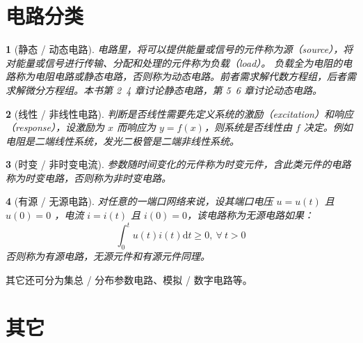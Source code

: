 \documentclass[UTF8]{report}
\theoremstyle{MyLineTheoremStyle} %
\theoremstyle{MyBlockTheoremStyle} %
\theoremstyle{MySubsubsectionStyle} %
\newtheorem{definition}{}
\begin{document}
\section{电路分类}


\begin{definition}[静态 / 动态电路]
    电路里，将可以提供能量或信号的元件称为源（source），将对能量或信号进行传输、分配和处理的元件称为负载（load）。
    负载全为电阻的电路称为电阻电路或静态电路，否则称为动态电路。前者需求解代数方程组，后者需求解微分方程组。本书第 2~4 章讨论静态电路，第 5~6 章讨论动态电路。
\end{definition}


\begin{definition}[线性 / 非线性电路]
判断是否线性需要先定义系统的激励（excitation）和响应（response），设激励为 $x$ 而响应为 $y = f(x)$，则系统是否线性由 $f$ 决定。例如电阻是二端线性系统，发光二极管是二端非线性系统。
\end{definition}


\begin{definition}[时变 / 非时变电流]
参数随时间变化的元件称为时变元件，含此类元件的电路称为时变电路，否则称为非时变电路。
\end{definition}


\begin{definition}[有源 / 无源电路]
对任意的一端口网络来说，设其端口电压 $u = u(t)$ 且 $u(0) = 0$ ，电流 $i = i(t)$ 且 $i(0) = 0$，该电路称为无源电路如果：
\begin{equation}
\int_{0}^{t} u(t)i(t)\mathrm{d}t \geqslant 0,\ \forall\ t >0
\end{equation}
否则称为有源电路，无源元件和有源元件同理。
\end{definition}


其它还可分为集总 / 分布参数电路、模拟 / 数字电路等。

\section{其它}
\end{document}
